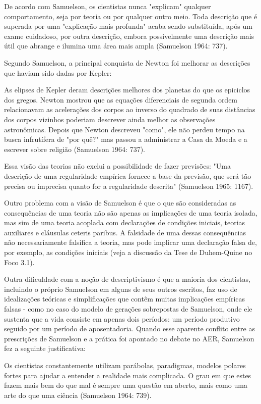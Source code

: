 \documentclass[12pt]{article}
\begin{document}
De acordo com Samuelson, os cientistas nunca "explicam" qualquer comportamento, seja por teoria ou por qualquer outro meio. Toda descrição que é superada por uma "explicação mais profunda" acaba sendo substituída, após um exame cuidadoso, por outra descrição, embora possivelmente uma descrição mais útil que abrange e ilumina uma área mais ampla (Samuelson 1964: 737).

Segundo Samuelson, a principal conquista de Newton foi melhorar as descrições que haviam sido dadas por Kepler:

As elipses de Kepler deram descrições melhores dos planetas do que os epiciclos dos gregos. Newton mostrou que as equações diferenciais de segunda ordem relacionavam as acelerações dos corpos ao inverso do quadrado de suas distâncias dos corpos vizinhos poderiam descrever ainda melhor as observações astronômicas. Depois que Newton descreveu "como", ele não perdeu tempo na busca infrutífera de "por quê?" mas passou a administrar a Casa da Moeda e a escrever sobre religião (Samuelson 1964: 737).

Essa visão das teorias não exclui a possibilidade de fazer previsões: "Uma descrição de uma regularidade empírica fornece a base da previsão, que será tão precisa ou imprecisa quanto for a regularidade descrita" (Samuelson 1965: 1167).

Outro problema com a visão de Samuelson é que o que são consideradas as consequências de uma teoria não são apenas as implicações de uma teoria isolada, mas sim de uma teoria acoplada com declarações de condições iniciais, teorias auxiliares e cláusulas ceteris paribus. A falsidade de uma dessas consequências não necessariamente falsifica a teoria, mas pode implicar uma declaração falsa de, por exemplo, as condições iniciais (veja a discussão da Tese de Duhem-Quine no Foco 3.1).

Outra dificuldade com a noção de descriptivismo é que a maioria dos cientistas, incluindo o próprio Samuelson em alguns de seus outros escritos, faz uso de idealizações teóricas e simplificações que contêm muitas implicações empíricas falsas - como no caso do modelo de gerações sobrepostas de Samuelson, onde ele sustenta que a vida consiste em apenas dois períodos: um período produtivo seguido por um período de aposentadoria. Quando esse aparente conflito entre as prescrições de Samuelson e a prática foi apontado no debate no AER, Samuelson fez a seguinte justificativa:

Os cientistas constantemente utilizam parábolas, paradigmas, modelos polares fortes para ajudar a entender a realidade mais complicada. O grau em que estes fazem mais bem do que mal é sempre uma questão em aberto, mais como uma arte do que uma ciência (Samuelson 1964: 739).
\end{document}
